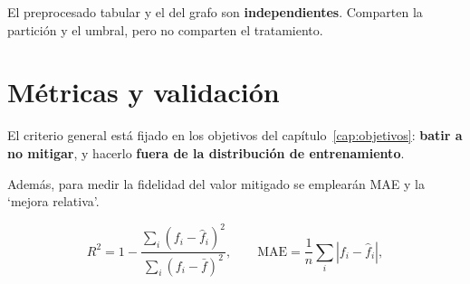 El preprocesado tabular y el del grafo son \textbf{independientes}. Comparten la partición y el umbral, pero no comparten el tratamiento.


\section{Métricas y validación}
\label{sec:criterios}
%
%
%

El criterio general está fijado en los objetivos del capítulo~\ref{cap:objetivos}: \textbf{batir
a no mitigar}, y hacerlo \textbf{fuera de la distribución de entrenamiento}. 

\label{sec:metrica_decide}%

\begin{center}
\end{center}

Además, para medir la fidelidad del valor mitigado se emplearán MAE y la `mejora relativa'.

\begin{equation}
\label{eq:metricas}
R^2 = 1 - \frac{\sum_i (f_i - \hat f_i)^2}{\sum_i (f_i - \bar f)^2} ,
\qquad
\text{MAE} = \frac{1}{n}\sum_i \left| f_i - \hat f_i \right| ,
\end{equation}

